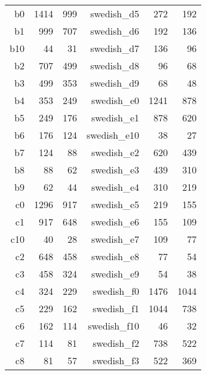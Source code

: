 \begin{figure}
\begin{tabular}{|rrr|rrr|}
                        b0 &   1414 &    999 &       swedish\_d5 &    272 &    192 \\
                        b1 &    999 &    707 &       swedish\_d6 &    192 &    136 \\
                       b10 &     44 &     31 &       swedish\_d7 &    136 &     96 \\
                        b2 &    707 &    499 &       swedish\_d8 &     96 &     68 \\
                        b3 &    499 &    353 &       swedish\_d9 &     68 &     48 \\
                        b4 &    353 &    249 &       swedish\_e0 &   1241 &    878 \\
                        b5 &    249 &    176 &       swedish\_e1 &    878 &    620 \\
                        b6 &    176 &    124 &      swedish\_e10 &     38 &     27 \\
                        b7 &    124 &     88 &       swedish\_e2 &    620 &    439 \\
                        b8 &     88 &     62 &       swedish\_e3 &    439 &    310 \\
                        b9 &     62 &     44 &       swedish\_e4 &    310 &    219 \\
                        c0 &   1296 &    917 &       swedish\_e5 &    219 &    155 \\
                        c1 &    917 &    648 &       swedish\_e6 &    155 &    109 \\
                       c10 &     40 &     28 &       swedish\_e7 &    109 &     77 \\
                        c2 &    648 &    458 &       swedish\_e8 &     77 &     54 \\
                        c3 &    458 &    324 &       swedish\_e9 &     54 &     38 \\
                        c4 &    324 &    229 &       swedish\_f0 &   1476 &   1044 \\
                        c5 &    229 &    162 &       swedish\_f1 &   1044 &    738 \\
                        c6 &    162 &    114 &      swedish\_f10 &     46 &     32 \\
                        c7 &    114 &     81 &       swedish\_f2 &    738 &    522 \\
                        c8 &     81 &     57 &       swedish\_f3 &    522 &    369 \\

\end{tabular}
\end{figure}

